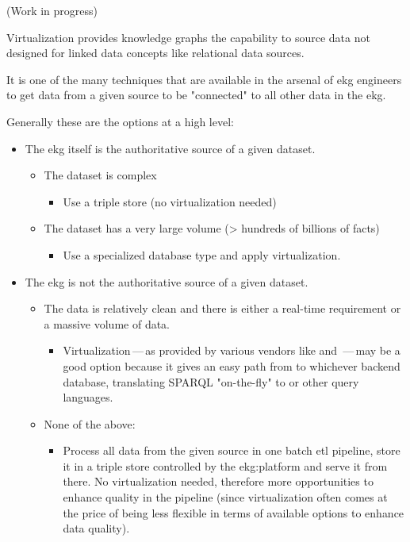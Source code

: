 %
%
(Work in progress)

Virtualization provides knowledge graphs the capability to source data not designed for linked data concepts
like relational data sources.

It is one of the many techniques that are available in the arsenal of \gls{ekg} engineers to get data from a given
source to be "connected" to all other data in the \gls{ekg}.

Generally these are the options at a high level:

\begin{itemize}
    \item The \gls{ekg} itself is the authoritative source of a given dataset.
    \begin{itemize}
        \item The dataset is complex
        \begin{itemize}
            \item Use a triple store (no virtualization needed)
        \end{itemize}
        \item The dataset has a very large volume (> hundreds of billions of facts)
        \begin{itemize}
            \item Use a specialized database type and apply virtualization.
        \end{itemize}
    \end{itemize}
    \item The \gls{ekg} is not the authoritative source of a given dataset.
    \begin{itemize}
        \item The data is relatively clean and there is either a real-time requirement or a massive volume of data.
        \begin{itemize}
            \item Virtualization\,---\,as provided by various vendors like \stardog and \ontotextgraphdb\,---\,may be a
            good option because it gives an easy path from  to whichever backend database,
            translating SPARQL "on-the-fly" to  or other query languages.
        \end{itemize}
        \item None of the above:
        \begin{itemize}
            \item Process all data from the given source in one batch \gls{etl} pipeline,
            store it in a triple store controlled by the \gls{ekg:platform} and serve it from there.
            No virtualization needed, therefore more opportunities to enhance quality in the pipeline (since
            virtualization often comes at the price of being less flexible in terms of available options to enhance
            data quality).
        \end{itemize}
    \end{itemize}
\end{itemize}

